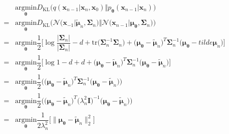 \documentclass[14pt, a4paper]{article}
\numberwithin{equation}{section}
\numberwithin{figure}{section}
\numberwithin{dl}{section}
\numberwithin{md}{section}
\numberwithin{bd}{section}
\numberwithin{dn}{section}
\numberwithin{hq}{section}
\begin{document}
    \begin{equation}
        \begin{aligned}
            &\underset{\boldsymbol{\theta}}{\mathrm{argmin}} D_{\mathrm{KL}} \Big( q(\boldsymbol{x}_{n-1} \vert \boldsymbol{x}_n, \boldsymbol{x}_0) \Vert p_{\boldsymbol{\theta}} (\boldsymbol{x}_{n-1} \vert \boldsymbol{x}_n) \Big) \\
            = &\underset{\boldsymbol{\theta}}{\mathrm{argmin}} D_{\mathrm{KL}} \Big( \mathcal{N} \big( \boldsymbol{x}_{-1} \vert \tilde{\boldsymbol{\mu}}_{n}, \boldsymbol{\Sigma}_n \big) \Vert \mathcal{N} \big( \boldsymbol{x}_{n-1} \vert \boldsymbol{\mu}_{\boldsymbol{\theta}}, \boldsymbol{\Sigma}_n \big) \Big) \\
            = &\underset{\boldsymbol{\theta}}{\mathrm{argmin}} \dfrac{1}{2} \Big \lbrack \log \dfrac{\lvert \boldsymbol{\Sigma}_n \rvert}{\lvert \boldsymbol{\Sigma}_n \rvert} -d + \mathrm{tr} \big( \boldsymbol{\Sigma}_n^{-1} \boldsymbol{\Sigma}_n \big) + \big( \boldsymbol{\mu}_{\boldsymbol{\theta}} - \tilde{\boldsymbol{\mu}}_n \big)^T \boldsymbol{\Sigma}_n^{-1} \big( \boldsymbol{\mu}_{\boldsymbol{\theta}} - tilde{\boldsymbol{\mu}}_n \big) \Bigg \rbrack \\
            = &\underset{\boldsymbol{\theta}}{\mathrm{argmin}} \dfrac{1}{2} \big \lbrack \log 1 - d + d + \big( \boldsymbol{\mu}_{\boldsymbol{\theta}} - \tilde{\boldsymbol{\mu}}_n \big)^T \boldsymbol{\Sigma}_n^{-1} \big( \boldsymbol{\mu}_{\boldsymbol{\theta}} - \tilde{\boldsymbol{\mu}}_n \big) \big \rbrack \\
            = &\underset{\boldsymbol{\theta}}{\mathrm{argmin}} \dfrac{1}{2} \big( \big( \boldsymbol{\mu}_{\boldsymbol{\theta}} - \tilde{\boldsymbol{\mu}}_n \big)^T \boldsymbol{\Sigma}_n^{-1} \big( \boldsymbol{\mu}_{\boldsymbol{\theta}} - \tilde{\boldsymbol{\mu}}_n \big) \big) \\
            = &\underset{\boldsymbol{\theta}}{\mathrm{argmin}} \dfrac{1}{2} \big( \big( \boldsymbol{\mu}_{\boldsymbol{\theta}} - \tilde{\boldsymbol{\mu}}_n \big)^T \big( \lambda_n^2 \boldsymbol{I} \big)^{-1} \big( \boldsymbol{\mu}_{\boldsymbol{\theta}} - \tilde{\boldsymbol{\mu}}_n \big) \big) \\
            = &\underset{\boldsymbol{\theta}}{\mathrm{argmin}} \dfrac{1}{2\lambda_n^2} \Big \lbrack \lVert \boldsymbol{\mu}_{\boldsymbol{\theta}} - \tilde{\boldsymbol{\mu}}_n \rVert_2^2 \Big \rbrack
        \end{aligned}
    \end{equation}
\end{document}
